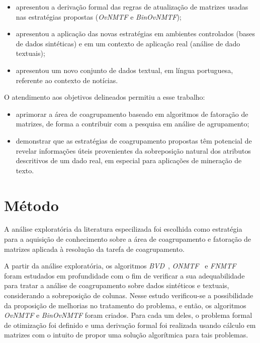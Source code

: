 \documentclass[
    12pt,                %
    oneside,            %
    a4paper,            %
    english,            %
    brazil                %
    ]{abntex2ppgsi}
\begin{document}
\begin{itemize}
\item apresentou a derivação formal das regras de atualização de matrizes usadas nas estratégias propostas (\textit{OvNMTF} e \textit{BinOvNMTF});
\item apresentou a aplicação das novas estratégias em ambientes controlados (bases de dados sintéticas) e em um contexto de aplicação real (análise de dado textuais);
\item apresentou um novo conjunto de dados textual, em língua portuguesa, referente ao contexto de notícias.
\end{itemize}

O atendimento aos objetivos delineados permitiu a esse trabalho:

\begin{itemize}
\item aprimorar a área de coagrupamento baseado em algoritmos de fatoração de matrizes, de forma a contribuir com a pesquisa em análise de agrupamento;
\item demonstrar que as estratégias de coagrupamento propostas têm potencial de revelar informações úteis provenientes da sobreposição natural dos atributos descritivos de um dado real, em especial para aplicações de mineração de texto.
\end{itemize}


\section{Método}

A análise exploratória da literatura especilizada foi escolhida como estratégia para a aquisição de conhecimento sobre a área de coagrupamento e fatoração de matrizes aplicada à resolução da tarefa de coagrupamento.

A partir da análise exploratória, os algoritmos \textit{BVD}~\cite{Long2005}, \textit{ONMTF}~\cite{Ding06,Yoo2010} e \textit{FNMTF}~\cite{Wang2011} foram estudados em profundidade com o fim de verificar a sua adequabilidade para tratar a análise de coagrupamento sobre dados sintéticos e textuais, considerando a sobreposição de colunas.
Nesse estudo verificou-se a possibilidade da proposição de melhorias no tratamento do problema, e então, os algoritmos \textit{OvNMTF} e \textit{BinOvNMTF} foram criados.
Para cada um deles, o problema formal de otimização foi definido e uma derivação formal foi realizada usando cálculo em matrizes com o intuito de propor uma solução algorítmica para tais problemas.
\end{document}
